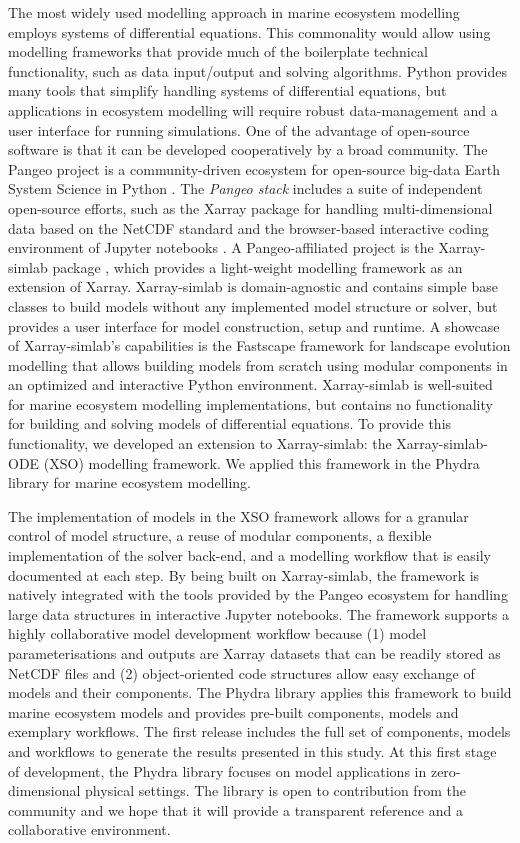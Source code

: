 \documentclass[journal abbreviation, manuscript]{copernicus}
\begin{document}
The most widely used modelling approach in marine ecosystem modelling employs systems of differential equations. This commonality would allow using modelling frameworks that provide much of the boilerplate technical functionality, such as data input/output and solving algorithms. Python provides many tools that simplify handling systems of differential equations, but applications in ecosystem modelling will require robust data-management and a user interface for running simulations. One of the advantage of open-source software is that it can be developed cooperatively by a broad community. The Pangeo project is a community-driven ecosystem for open-source big-data Earth System Science in Python \citep{Eynard-Bontemps2019TheCNES}. The \textit{Pangeo stack} includes a suite of independent open-source efforts, such as the Xarray package \citep{Hoyer2017Xarray:Python} for handling multi-dimensional data based on the NetCDF standard and the browser-based interactive coding environment of Jupyter notebooks \citep{Kluyver2016JupyterWorkflows}. A Pangeo-affiliated project is the Xarray-simlab package \citep{Bovy2018Xarray-simlab:Interactively}, which provides a light-weight modelling framework as an extension of Xarray. Xarray-simlab is domain-agnostic and contains simple base classes to build models without any implemented model structure or solver, but provides a user interface for model construction, setup and runtime. A showcase of Xarray-simlab's capabilities is the Fastscape framework for landscape evolution modelling \citep{benoit_bovy_2020_3840917} that allows building models from scratch using modular components in an optimized and interactive Python environment. Xarray-simlab is well-suited for marine ecosystem modelling implementations, but contains no functionality for building and solving models of differential equations. To provide this functionality, we developed an extension to Xarray-simlab: the Xarray-simlab-ODE (XSO) modelling framework. We applied this framework in the Phydra library for marine ecosystem modelling. 

The implementation of models in the XSO framework allows for a granular control of model structure, a reuse of modular components, a flexible implementation of the solver back-end, and a modelling workflow that is easily documented at each step. By being built on Xarray-simlab, the framework is natively integrated with the tools provided by the Pangeo ecosystem for handling large data structures in interactive Jupyter notebooks. The framework supports a highly collaborative model development workflow because (1) model parameterisations and outputs are Xarray datasets that can be readily stored as NetCDF files and (2) object-oriented code structures allow easy exchange of models and their components. The Phydra library applies this framework to build marine ecosystem models and provides pre-built components, models and exemplary workflows. The first release includes the full set of components, models and workflows to generate the results presented in this study. At this first stage of development, the Phydra library focuses on model applications in zero-dimensional physical settings. The library is open to contribution from the community and we hope that it will provide a transparent reference and a collaborative environment. 
\end{document}
